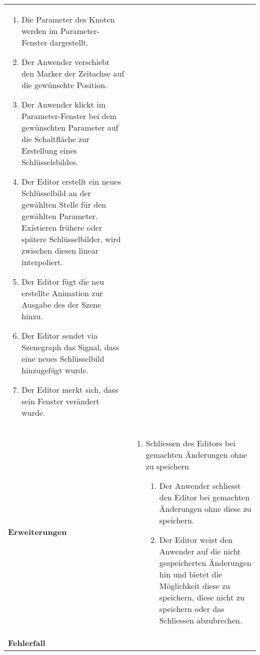 \begin{longtabu}{p{0.5\textwidth}p{0.5\textwidth}}
\begin{enumerate}
            \item{Die Parameter des Knoten werden im Parameter-Fenster
                    dargestellt.}
            \item{Der Anwender verschiebt den Marker der Zeitachse auf
                    die gewünschte Position.}
            \item{Der Anwender klickt im Parameter-Fenster bei dem
                    gewünschten Parameter auf die Schaltfläche zur
                    Erstellung eines Schlüsselsbildes.}
            \item{Der Editor erstellt ein neues Schlüsselbild an der
                    gewählten Stelle für den gewählten Parameter.
                    Existieren frühere oder spätere Schlüsselbilder, wird
                    zwischen diesen linear interpoliert.}
            \item{Der Editor fügt die neu erstellte Animation zur Ausgabe des
                    der Szene hinzu.}
            \item{Der Editor sendet via Szenegraph das Signal, dass eine
                    neues Schlüsselbild hinzugefügt wurde.}
            \item{Der Editor merkt sich, dass sein Fenster verändert
                    wurde.}
        \end{enumerate} \\
    \cmidrule(r){1-1}\cmidrule(lr){2-2}
        \textbf{Erweiterungen} &
        \begin{enumerate}[label= (\alph*)]
            \item{Schliessen des Editors bei gemachten Änderungen ohne zu
                    speichern
                \begin{enumerate}[label= (\roman*)]
                    \item{Der Anwender schliesst den Editor bei gemachten
                            Änderungen ohne diese zu speichern.}
                    \item{Der Editor weist den Anwender auf die
                            nicht gespeicherten Änderungen hin und bietet
                            die Möglichkeit diese zu speichern, diese nicht
                            zu speichern oder das Schliessen abzubrechen.}
                \end{enumerate}
            }
        \end{enumerate}\\
    \cmidrule(r){1-1}\cmidrule(lr){2-2}
        \textbf{Fehlerfall} &
        \begin{enumerate}[label= (\alph*)]

\end{enumerate}
\end{longtabu}
